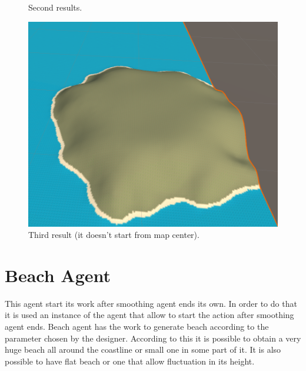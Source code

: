 \documentclass[12pt]{article}
\begin{document}
    \begin{figure}[H]
        \centering     %
        \caption{Second results.}
    \end{figure}

    \begin{figure}[H]
        \centering
        \includegraphics[scale = 0.3]{images/Smoothing agent/256 agenti/4}
        \caption{Third result (it doesn't start from map center).}
    \end{figure}

    \newpage

    \section{Beach Agent}
    This agent start its work after smoothing agent ends its own. In order to do that it is used an instance of the agent that allow to start the action after smoothing agent ends.
    Beach agent has the work to generate beach according to the parameter chosen by the designer.
    According to this it is possible to obtain a very huge beach all around the coastline or small one in some part of it. It is also possible
    to have flat beach or one that allow fluctuation in its height.
\end{document}
